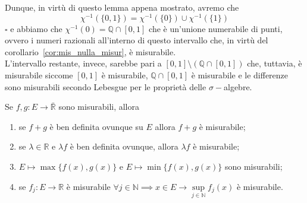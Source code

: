 	Dunque, in virtù di questo lemma appena mostrato, avremo che
	$$
		\chi^{-1}(\{0, 1\}) = \chi^{-1}(\{0 \}) \cup \chi^{-1}(\{1 \})
	$$
\hfill $\square$
%
\vspace{0.5cm}
e abbiamo che $\chi^{-1}({0}) = \mathbb{Q} \cap [0, 1]$ che è un'unione numerabile di punti, ovvero i numeri razionali all'interno di questo intervallo che, in virtù del corollario~\ref{cor:mis_nulla_misur}, è misurabile. \\
L'intervallo restante, invece, sarebbe pari a $[0, 1] \setminus (\mathbb{Q} \cap [0,1])$ che, tuttavia, è misurabile siccome $[0,1]$ è misurabile, $\mathbb{Q} \cap [0,1]$ è misurabile e le differenze sono misurabili secondo Lebesgue per le proprietà delle $\sigma-$algebre.
%
\vspace{0.5cm}
\begin{prop}
	Se $f, g: E \to \bar{\mathbb{R}}$ sono misurabili, allora
	\begin{enumerate}[label=\protect\circled{\arabic*}]
		\item se $f+g$ è ben definita ovunque su $E$ allora $f+g$ è misurabile;
		\item se $\lambda \in \mathbb{R}$ e $\lambda f$ è ben definita ovunque, allora $\lambda f$ è misurabile;
		\item $E \mapsto \max\{f(x), g(x) \}$ e $E \mapsto \min\{f(x),g(x) \}$ sono misurabili;
		\item se $f_j: E \to \mathbb{R}$ è misurabile $\forall j \in \mathbb{N} \implies x \in E \to \sup\limits_{j \in \mathbb{N}} f_j(x)$ è misurabile.
	\end{enumerate}
	\label{prop:f_g_mis}
\end{prop}
%
%
%
\vspace{0.5cm}
